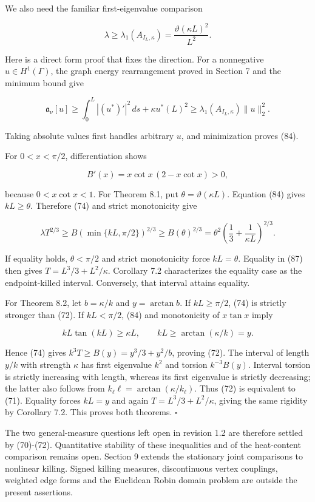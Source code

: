 \documentclass[11pt]{article}
\begin{document}
We also need the familiar first-eigenvalue comparison

\[
\lambda\ge\lambda_1(A_{I_L,\kappa})
=\frac{\vartheta(\kappa L)^2}{L^2}.
\tag{84}
\]

Here is a direct form proof that fixes the direction. For a nonnegative
\(u\in H^1(\Gamma)\), the graph energy rearrangement proved in Section 7
and the minimum bound give

\[
\mathfrak a_\nu[u]
\ge\int_0^L|(u^*)'|^2\,ds+\kappa u^*(L)^2
\ge\lambda_1(A_{I_L,\kappa})\|u\|_2^2.
\tag{85}
\]

Taking absolute values first handles arbitrary \(u\), and minimization
proves (84).

For \(0<x<\pi/2\), differentiation shows

\[
B'(x)=x\cot x\,(2-x\cot x)>0,
\tag{86}
\]

because \(0<x\cot x<1\). For Theorem 8.1, put
\(\theta=\vartheta(\kappa L)\). Equation (84) gives \(kL\ge\theta\).
Therefore (74) and strict monotonicity give

\[
\lambda T^{2/3}
\ge B(\min\{kL,\pi/2\})^{2/3}
\ge B(\theta)^{2/3}
=\theta^2\left(\frac13+\frac1{\kappa L}\right)^{2/3}.
\tag{87}
\]

If equality holds, \(\theta<\pi/2\) and strict monotonicity force
\(kL=\theta\). Equality in (87) then gives \(T=L^3/3+L^2/\kappa\).
Corollary 7.2 characterizes the equality case as the endpoint-killed
interval. Conversely, that interval attains equality.

For Theorem 8.2, let \(b=\kappa/k\) and \(y=\arctan b\). If
\(kL\ge\pi/2\), (74) is strictly stronger than (72). If \(kL<\pi/2\),
(84) and monotonicity of \(x\tan x\) imply

\[
kL\tan(kL)\ge\kappa L,
\qquad kL\ge\arctan(\kappa/k)=y.
\tag{88}
\]

Hence (74) gives \(k^3T\ge B(y)=y^3/3+y^2/b\), proving (72). The
interval of length \(y/k\) with strength \(\kappa\) has first eigenvalue
\(k^2\) and torsion \(k^{-3}B(y)\). Interval torsion is strictly
increasing with length, whereas its first eigenvalue is strictly
decreasing; the latter also follows from
\(k_\ell\ell=\arctan(\kappa/k_\ell)\). Thus (72) is equivalent to (71).
Equality forces \(kL=y\) and again \(T=L^3/3+L^2/\kappa\), giving the
same rigidity by Corollary 7.2. This proves both theorems. \(\square\)

The two general-measure questions left open in revision 1.2 are
therefore settled by (70)-(72). Quantitative stability of these
inequalities and of the heat-content comparison remains open. Section 9
extends the stationary joint comparisons to nonlinear killing. Signed
killing measures, discontinuous vertex couplings, weighted edge forms
and the Euclidean Robin domain problem are outside the present
assertions.
\end{document}
